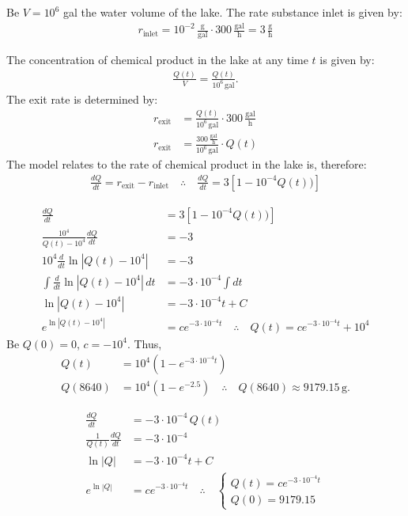 \begin{solution}
	\begin{solparts}
		\item
		Be $V=10^6$ gal the water volume of the lake. The rate substance inlet is given by:
		\begin{gather*}
			r_{\text{inlet}}=10^{-2}\, \frac{\text{g}}{\text{gal}}\cdot 300\,\frac{\text{gal}}{\text{h}}=3\,\frac{\text{g}}{\text{h}}
		\end{gather*}
		
		The concentration of chemical product in the lake at any time $t$ is given by:
		\begin{gather*}
			\frac{Q(t)}{V}=\frac{Q(t)}{10^6\, \text{gal}}.
		\end{gather*}
		The exit rate is determined by:
		\begin{align*}
			r_{\text{exit}}&=\frac{Q(t)}{10^6\, \text{gal}}\cdot 300\,\frac{\text{gal}}{\text{h}}\\
			r_{\text{exit}}&=\frac{300\,\frac{\text{gal}}{\text{h}}}{10^6\, \text{gal}}\cdot Q(t)
		\end{align*}
		The model relates to the rate of chemical product in the lake is, therefore:
		\begin{gather*}
			\frac{dQ}{dt}=r_{\text{exit}}-r_{\text{inlet}} \quad \therefore \quad \boxed{\frac{dQ}{dt}=3[1-10^{-4}Q(t))]}
		\end{gather*}
	
		\item
		\begin{align*}
			\frac{dQ}{dt}&=3[1-10^{-4}Q(t))]\\
			\frac{10^4}{Q(t)-10^4}\frac{dQ}{dt}&=-3\\
			10^4\frac{d}{dt}\ln |Q(t)-10^4|&=-3\\
			\int \frac{d}{dt}\ln |Q(t)-10^4|\, dt&=-3\cdot 10^{-4}\int dt\\
			\ln |Q(t)-10^4|&=-3\cdot 10^{-4}t+C\\
			e^{\ln |Q(t)-10^4|}&=ce^{-3\cdot 10^{-4}t} \quad \therefore \quad Q(t)=ce^{-3\cdot 10^{-4}t}+10^4
		\end{align*}
		Be $Q(0)=0$, $c=-10^4$. Thus,
		\begin{align*}
			Q(t)&=10^4(1-e^{-3\cdot 10^{-4}t})\\
			Q(8640)&=10^4(1-e^{-2.5}) \quad \therefore \quad \boxed{Q(8640) \approx 9179.15\, \text{g}}.
		\end{align*}
		
		\item
		\begin{align*}
			\frac{dQ}{dt}&=-3\cdot 10^{-4}\,Q(t)\\
			\frac{1}{Q(t)}\frac{dQ}{dt}&=-3\cdot 10^{-4}\\
			\ln|Q|&=-3\cdot 10^{-4}t+C\\
			e^{\ln|Q|}&=ce^{-3\cdot 10^{-4}t}\quad \therefore \quad
			\boxed{
			\begin{cases}
				Q(t)=ce^{-3\cdot 10^{-4}t}\\
				Q(0)=9179.15
			\end{cases}
		}
		\end{align*}
		

\end{solparts}
\end{solution}
